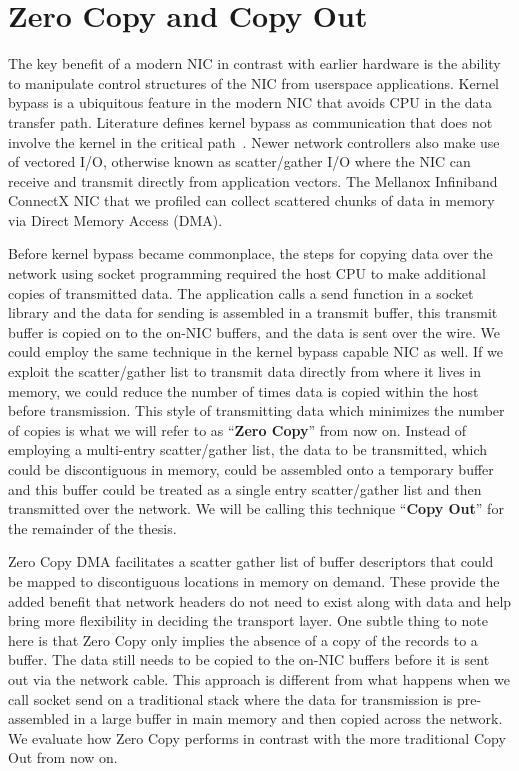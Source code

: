 \section{Zero Copy and Copy Out}
The key benefit of a modern NIC in contrast with earlier hardware is the ability to manipulate control structures of the NIC from userspace applications. 
Kernel bypass is a ubiquitous feature in the modern NIC that avoids CPU in the data transfer path.  Literature defines kernel bypass as communication that does not 
involve the kernel in the  critical path~\cite{unetkernelbypass}. Newer network controllers also make use of vectored I/O, otherwise known as scatter/gather I/O
where the NIC can receive and transmit directly from  application vectors. The Mellanox Infiniband ConnectX
NIC that we profiled can  collect scattered chunks of data in memory via Direct Memory Access (DMA).

Before kernel bypass became commonplace, the steps for copying data over the network using socket programming 
required the host CPU to make additional copies of transmitted data.
The application calls a send function in a socket library and the data for sending is assembled 
in a transmit buffer, this transmit buffer is copied on to the on-NIC buffers, and the data is 
sent over the wire. We could employ the same technique in the kernel bypass capable NIC as well.
If we exploit the scatter/gather list to transmit data directly from where it lives in memory, 
we could reduce the number of times data is copied within the host before transmission. 
This style of transmitting data which minimizes the number of copies is what we will refer to as \enquote{\textbf{Zero Copy}} from now on.
Instead of employing a multi-entry scatter/gather list, the data to be transmitted, which could be discontiguous in memory, could be assembled 
onto a temporary buffer and this buffer could be treated as a single entry scatter/gather list
and then transmitted over the network. We will be calling this technique \enquote{\textbf{Copy Out}} for the remainder of the thesis. 


Zero Copy DMA facilitates a scatter gather list of buffer descriptors
that could be mapped to discontiguous locations in memory on demand. These provide
the added benefit that network headers do not need to exist along with data and help bring more flexibility 
in deciding the transport layer. One subtle thing to note here is that Zero Copy only implies the absence 
of a copy of the records to a buffer. The data still needs to be copied to the on-NIC buffers before 
it is sent out via the network cable. This approach is different from what happens when we call socket send on 
a traditional stack where the data for transmission is pre-assembled in a large buffer in main memory 
and then copied across the network. We evaluate how Zero Copy performs in contrast 
with the more traditional Copy Out from now on.

